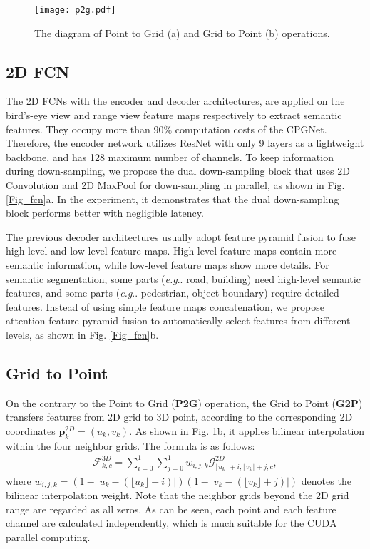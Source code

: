 \documentclass[letterpaper, 10 pt, conference]{ieeeconf}
\makeatletter
\DeclareRobustCommand\onedot{\futurelet\@let@token\@onedot}
\def\@onedot{\ifx\@let@token.\else.\null\fi\xspace}
\def\eg{\emph{e.g}\onedot} \def\Eg{\emph{E.g}\onedot}
\makeatother
\begin{document}
\begin{figure}[t]
\centering
\texttt{[image: p2g.pdf]}
\caption{The diagram of Point to Grid (a) and Grid to Point (b) operations.}
\label{Fig_p2g}
\end{figure}


\subsection{2D FCN}
The 2D FCNs with the encoder and decoder architectures, are applied on the bird’s-eye view and range view feature maps respectively to extract semantic features. They occupy more than $90\%$ computation costs of the CPGNet. Therefore, the encoder network utilizes ResNet \cite{he2016deep} with only 9 layers as a lightweight backbone, and has 128 maximum number of channels. To keep information during down-sampling, we propose the dual down-sampling block that uses 2D Convolution and 2D MaxPool for down-sampling in parallel, as shown in Fig. \ref{Fig_fcn}a. In the experiment, it demonstrates that the dual down-sampling block performs better with negligible latency.

The previous decoder architectures \cite{chen2018encoder, cortinhal2020salsanext} usually adopt feature pyramid fusion to fuse high-level and low-level feature maps. High-level feature maps contain more semantic information, while low-level feature maps show more details. For semantic segmentation, some parts (\eg road, building) need high-level semantic features, and some parts (\eg pedestrian, object boundary) require detailed features. Instead of using simple feature maps concatenation, we propose attention feature pyramid fusion to automatically select features from different levels, as shown in Fig. \ref{Fig_fcn}b.

\subsection{Grid to Point}
On the contrary to the Point to Grid ({\bf P2G}) operation, the Grid to Point ({\bf G2P}) transfers features from 2D grid to 3D point, according to the corresponding 2D coordinates $\boldsymbol{p}^{2D}_k=(u_k,v_k)$. As shown in Fig. \ref{Fig_p2g}b, it applies bilinear interpolation within the four neighbor grids. The formula is as follows:
\begin{align}
\boldsymbol{\mathcal{F}}^{3D}_{k,c} = \sum_{i=0}^{1} \sum_{j=0}^{1} w_{i,j,k} \boldsymbol{\mathcal{G}}^{2D}_{\lfloor u_k \rfloor+i,\lfloor v_k \rfloor + j,c},
\end{align}
where $w_{i,j,k} = (1-|u_k - (\lfloor u_k \rfloor + i)|)(1-|v_k - (\lfloor v_k \rfloor + j)|)$ denotes the bilinear interpolation weight. Note that the neighbor grids beyond the 2D grid range are regarded as all zeros. As can be seen, each point and each feature channel are calculated independently, which is much suitable for the CUDA parallel computing.
\end{document}
